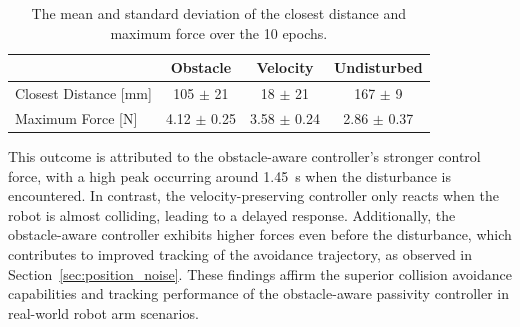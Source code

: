 \begin{table}[htb]
    \centering
    \begin{tabular}{|l|c|c|c|} \hline
        & Obstacle & Velocity & Undisturbed \\ \hline
         Closest Distance [mm] &  105 $\pm$ 21 & 18 $\pm$ 21 & 167 $\pm$ 9 \\ \hline
         Maximum Force [N] & 4.12 $\pm$ 0.25 & 3.58 $\pm$ 0.24 & 2.86 $\pm$ 0.37  \\ \hline 
    \end{tabular}
    \caption{The mean and standard deviation of the closest distance and maximum force over the 10 epochs.}
    \label{tab:evaluation_on_robot_arm}
\end{table}

This outcome is attributed to the obstacle-aware controller's stronger control force, with a high peak occurring around \qty{1.45}{s} when the disturbance is encountered. In contrast, the velocity-preserving controller only reacts when the robot is almost colliding, leading to a delayed response. Additionally, the obstacle-aware controller exhibits higher forces even before the disturbance, which contributes to improved tracking of the avoidance trajectory, as observed in Section~\ref{sec:position_noise}. These findings affirm the superior collision avoidance capabilities and tracking performance of the obstacle-aware passivity controller in real-world robot arm scenarios.


